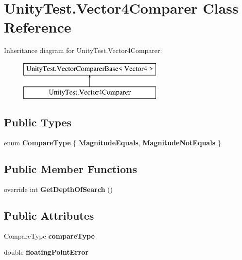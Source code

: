 \hypertarget{class_unity_test_1_1_vector4_comparer}{}\section{Unity\+Test.\+Vector4\+Comparer Class Reference}
\label{class_unity_test_1_1_vector4_comparer}
Inheritance diagram for Unity\+Test.\+Vector4\+Comparer\+:\begin{figure}[H]
\begin{center}
\leavevmode
\includegraphics[height=2.000000cm]{class_unity_test_1_1_vector4_comparer}
\end{center}
\end{figure}
\subsection*{Public Types}
\begin{DoxyCompactItemize}
\item 
\mbox{\label{class_unity_test_1_1_vector4_comparer_a8618c95cc1af41d5f81491ffb810111b}} 
enum {\bfseries Compare\+Type} \{ {\bfseries Magnitude\+Equals}, 
{\bfseries Magnitude\+Not\+Equals}
 \}
\end{DoxyCompactItemize}
\subsection*{Public Member Functions}
\begin{DoxyCompactItemize}
\item 
\mbox{\label{class_unity_test_1_1_vector4_comparer_a4e4143fce9a9199ca87b0d7001a77707}} 
override int {\bfseries Get\+Depth\+Of\+Search} ()
\end{DoxyCompactItemize}
\subsection*{Public Attributes}
\begin{DoxyCompactItemize}
\item 
\mbox{\label{class_unity_test_1_1_vector4_comparer_a18bbdb5f71a8e34b8ca384f47e460a66}} 
Compare\+Type {\bfseries compare\+Type}
\item 
\mbox{\label{class_unity_test_1_1_vector4_comparer_a0e6eb9722d464915a503249cdbc1cdc5}} 
double {\bfseries floating\+Point\+Error}
\end{DoxyCompactItemize}
